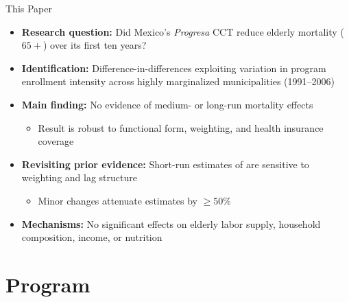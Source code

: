 \documentclass[aspectratio=169,usenames,dvipsnames]{beamer}
\begin{document}
\begin{frame}{This Paper}\label{thispaper}
\vspace{4pt}
\small
\begin{itemize}
  \item[$\circ$] \textbf{Research question:} Did Mexico's \textit{Progresa} CCT reduce elderly mortality ($65+$) over its first ten years?
  \vspace{6pt}
  \item[$\circ$] \textbf{Identification:} Difference-in-differences exploiting variation in program enrollment intensity across highly marginalized municipalities (1991--2006)
  \vspace{6pt}
  \item[$\circ$] \textbf{Main finding:} \textcolor{redUT}{No evidence of medium- or long-run mortality effects}
    \begin{itemize}
      \item Result is robust to functional form, weighting, and health insurance coverage
    \end{itemize}
  \vspace{6pt}
  \item[$\circ$] \textbf{Revisiting prior evidence:} Short-run estimates of \cite{BarhamRowberry2013JDE} are sensitive to weighting and lag structure
    \begin{itemize}
      \item Minor changes attenuate estimates by $\geq 50\%$
    \end{itemize}
  \vspace{6pt}
  \item[$\circ$] \textbf{Mechanisms:} No significant effects on elderly labor supply, household composition, income, or nutrition
\end{itemize}
\end{frame}


\section{Program}
\end{document}
